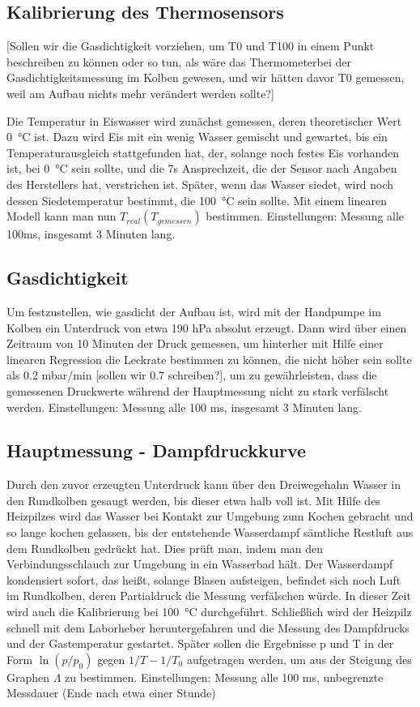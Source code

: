 \documentclass[]{article}
\begin{document}
\subsection {Kalibrierung des Thermosensors}  {\color{red}[Sollen wir die Gasdichtigkeit vorziehen, um T0 und T100 in einem Punkt beschreiben zu können oder so tun, als wäre das Thermometerbei der Gasdichtigkeitsmessung im Kolben gewesen, und wir hätten davor T0 gemessen, weil am Aufbau nichts mehr verändert werden sollte?]}

Die Temperatur in Eiswasser wird zunächst gemessen, deren theoretischer Wert \SI{0}{\celsius} ist. Dazu wird Eis mit ein wenig Wasser gemischt und gewartet, bis ein Temperaturausgleich stattgefunden hat, der, solange noch festes Eis vorhanden ist, bei \SI{0}{\celsius} sein sollte, und die 7s Ansprechzeit, die der Sensor nach Angaben des Herstellers hat, verstrichen ist. Später, wenn das Wasser siedet, wird noch dessen Siedetemperatur bestimmt, die \SI{100}{\celsius} sein sollte. Mit einem linearen Modell kann man nun $T_{real}(T_{gemessen})$ bestimmen.
Einstellungen: Messung alle 100ms, insgesamt 3 Minuten lang.

\subsection{Gasdichtigkeit}
Um festzustellen, wie gasdicht der Aufbau ist, wird mit der Handpumpe im Kolben ein Unterdruck von etwa 190 hPa absolut erzeugt. Dann wird über einen Zeitraum von 10 Minuten der Druck gemessen, um hinterher mit Hilfe einer linearen Regression die Leckrate bestimmen zu können, die nicht höher sein sollte als 0.2 mbar/min {\color{red}[sollen wir 0.7 schreiben?]}, um zu gewährleisten, dass die gemessenen Druckwerte während der Hauptmessung nicht zu stark verfälscht werden. 
Einstellungen: Messung alle 100 ms, insgesamt 3 Minuten lang.


\subsection{Hauptmessung - Dampfdruckkurve}
Durch den zuvor erzeugten Unterdruck kann über den Dreiwegehahn Wasser in den Rundkolben gesaugt werden, bis dieser etwa halb voll ist. Mit Hilfe des Heizpilzes wird das Wasser bei Kontakt zur Umgebung zum Kochen gebracht und so lange kochen gelassen, bis der entstehende Wasserdampf sämtliche Restluft aus dem Rundkolben gedrückt hat. Dies prüft man, indem man den Verbindungsschlauch zur Umgebung in ein Wasserbad hält. Der Wasserdampf kondensiert sofort, das heißt, solange Blasen aufsteigen, befindet sich noch Luft im Rundkolben, deren Partialdruck die Messung verfälschen würde. In dieser Zeit wird auch die Kalibrierung bei \SI{100}{\celsius} durchgeführt. Schließlich wird der Heizpilz schnell mit dem Laborheber heruntergefahren und die Messung des Dampfdrucks und der Gastemperatur gestartet. Später sollen die Ergebnisse p und T in der Form $\ln(p/p_0)$ gegen $1/T-1/T_0$ aufgetragen werden, um aus der Steigung des Graphen $\Lambda$ zu bestimmen.
Einstellungen: Messung alle 100 ms, unbegrenzte Messdauer (Ende nach etwa einer Stunde)\\
\end{document}
